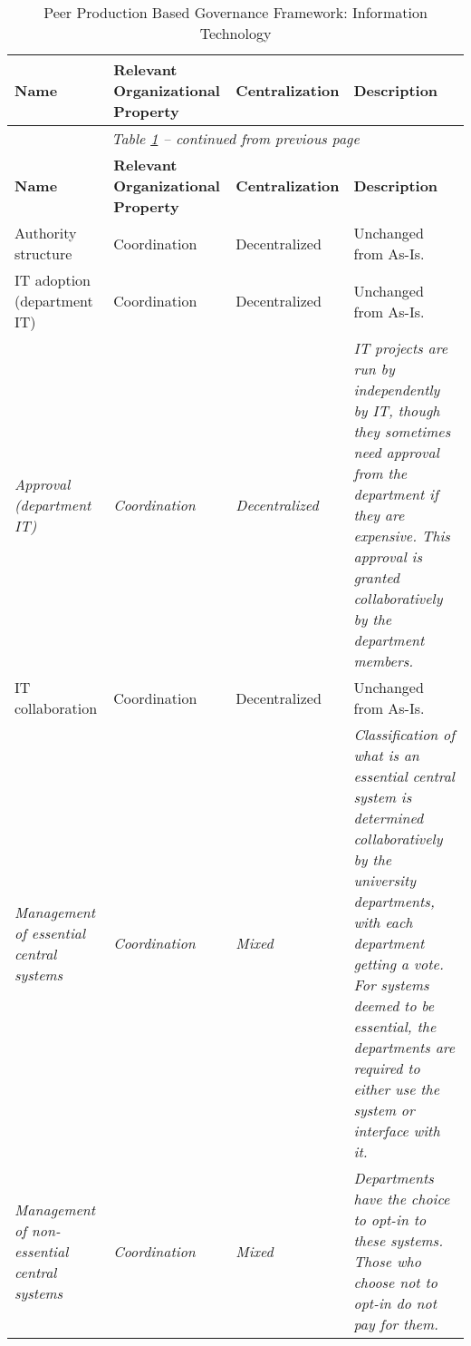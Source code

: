 \begin{center}
\begin{longtable}{ | p{} | p{}| p{} | p{}|}
\caption{Peer Production Based Governance Framework: Information Technology} \label{table:peerITGovernance} \\
%
\hline
\textbf{Name} & 
\textbf{Relevant Organizational Property} &
\textbf{Centralization} &  
\textbf{Description} \\ \hline
\endfirsthead
%
\multicolumn{4}{c}{\textit{Table \ref{table:peerITGovernance} -- continued from previous page}} \\  
\hline
\textbf{Name} & 
\textbf{Relevant Organizational Property} &
\textbf{Centralization} &  
\textbf{Description} \\ \hline
\endhead
%
 Authority structure & 
 Coordination &
 Decentralized  &
 Unchanged from As-Is.  \\
%
\hline
%
 IT adoption (department IT)& 
 Coordination &
 Decentralized & 
 Unchanged from As-Is. \\
%
\hline
%
%
 \textit{Approval (department IT)} &
 \textit{Coordination} &
 \textit{Decentralized} &
 \textit{IT projects are run by independently by IT, though they sometimes need approval from the department if they are expensive. This approval is granted collaboratively by the department members.}  \\
%
\hline
%
 IT collaboration & 
 Coordination &
 Decentralized  &
 Unchanged from As-Is.  \\
%
\hline
%
 \textit{Management of essential central systems} &
 \textit{Coordination} &
 \textit{Mixed} &
 \textit{Classification of what is an essential central system is determined collaboratively by the university departments, with each department getting a vote. For systems deemed to be essential, the departments are required to either use the system or interface with it.} \\ %
%
\hline
%
\textit{Management of non-essential central systems} &
 \textit{Coordination} &
 \textit{Mixed} &
 \textit{Departments have the choice to opt-in to these systems. Those who choose not to opt-in do not pay for them.}  \\
%
\hline
%
\end{longtable}
\end{center}
%  
%
%
%
%
%
%
%
%
%
%
%


